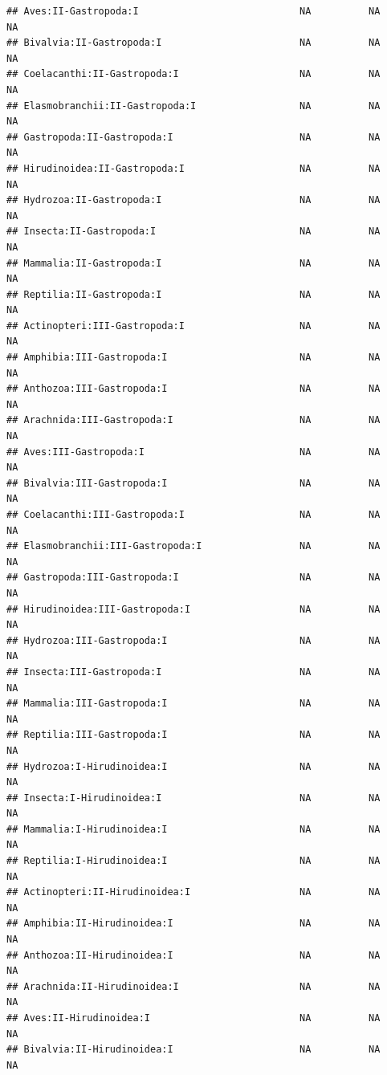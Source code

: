 \documentclass[
  12pt,
]{article}
\begin{document}
\begin{verbatim}
## Aves:II-Gastropoda:I                            NA          NA          NA
## Bivalvia:II-Gastropoda:I                        NA          NA          NA
## Coelacanthi:II-Gastropoda:I                     NA          NA          NA
## Elasmobranchii:II-Gastropoda:I                  NA          NA          NA
## Gastropoda:II-Gastropoda:I                      NA          NA          NA
## Hirudinoidea:II-Gastropoda:I                    NA          NA          NA
## Hydrozoa:II-Gastropoda:I                        NA          NA          NA
## Insecta:II-Gastropoda:I                         NA          NA          NA
## Mammalia:II-Gastropoda:I                        NA          NA          NA
## Reptilia:II-Gastropoda:I                        NA          NA          NA
## Actinopteri:III-Gastropoda:I                    NA          NA          NA
## Amphibia:III-Gastropoda:I                       NA          NA          NA
## Anthozoa:III-Gastropoda:I                       NA          NA          NA
## Arachnida:III-Gastropoda:I                      NA          NA          NA
## Aves:III-Gastropoda:I                           NA          NA          NA
## Bivalvia:III-Gastropoda:I                       NA          NA          NA
## Coelacanthi:III-Gastropoda:I                    NA          NA          NA
## Elasmobranchii:III-Gastropoda:I                 NA          NA          NA
## Gastropoda:III-Gastropoda:I                     NA          NA          NA
## Hirudinoidea:III-Gastropoda:I                   NA          NA          NA
## Hydrozoa:III-Gastropoda:I                       NA          NA          NA
## Insecta:III-Gastropoda:I                        NA          NA          NA
## Mammalia:III-Gastropoda:I                       NA          NA          NA
## Reptilia:III-Gastropoda:I                       NA          NA          NA
## Hydrozoa:I-Hirudinoidea:I                       NA          NA          NA
## Insecta:I-Hirudinoidea:I                        NA          NA          NA
## Mammalia:I-Hirudinoidea:I                       NA          NA          NA
## Reptilia:I-Hirudinoidea:I                       NA          NA          NA
## Actinopteri:II-Hirudinoidea:I                   NA          NA          NA
## Amphibia:II-Hirudinoidea:I                      NA          NA          NA
## Anthozoa:II-Hirudinoidea:I                      NA          NA          NA
## Arachnida:II-Hirudinoidea:I                     NA          NA          NA
## Aves:II-Hirudinoidea:I                          NA          NA          NA
## Bivalvia:II-Hirudinoidea:I                      NA          NA          NA

\end{verbatim}
\end{document}

